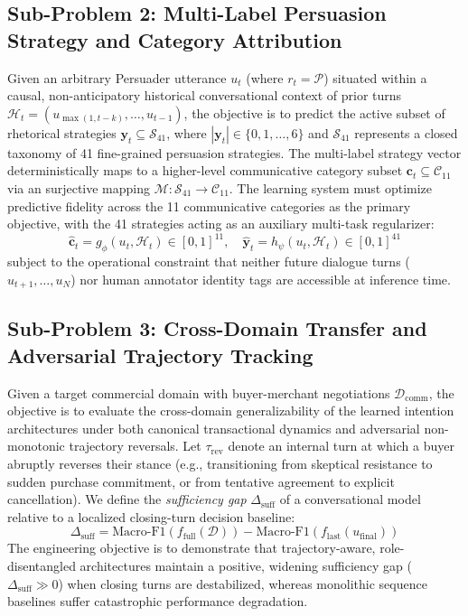 \subsection{Sub-Problem 2: Multi-Label Persuasion Strategy and Category Attribution}
Given an arbitrary Persuader utterance $u_t$ (where $r_t = \mathcal{P}$) situated within a causal, non-anticipatory historical conversational context of prior turns $\mathcal{H}_t = (u_{\max(1, t-k)}, \dots, u_{t-1})$, the objective is to predict the active subset of rhetorical strategies $\mathbf{y}_t \subseteq \mathcal{S}_{41}$, where $|\mathbf{y}_t| \in \{0, 1, \dots, 6\}$ and $\mathcal{S}_{41}$ represents a closed taxonomy of 41 fine-grained persuasion strategies. The multi-label strategy vector deterministically maps to a higher-level communicative category subset $\mathbf{c}_t \subseteq \mathcal{C}_{11}$ via an surjective mapping $\mathcal{M}: \mathcal{S}_{41} \to \mathcal{C}_{11}$. The learning system must optimize predictive fidelity across the 11 communicative categories as the primary objective, with the 41 strategies acting as an auxiliary multi-task regularizer:
\begin{equation}
  \hat{\mathbf{c}}_t = g_\phi(u_t, \mathcal{H}_t) \in [0, 1]^{11}, \quad \hat{\mathbf{y}}_t = h_\psi(u_t, \mathcal{H}_t) \in [0, 1]^{41}
\end{equation}
subject to the operational constraint that neither future dialogue turns ($u_{t+1}, \dots, u_N$) nor human annotator identity tags are accessible at inference time.

\subsection{Sub-Problem 3: Cross-Domain Transfer and Adversarial Trajectory Tracking}
Given a target commercial domain with buyer-merchant negotiations $\mathcal{D}_{\text{comm}}$, the objective is to evaluate the cross-domain generalizability of the learned intention architectures under both canonical transactional dynamics and adversarial non-monotonic trajectory reversals. Let $\tau_{\text{rev}}$ denote an internal turn at which a buyer abruptly reverses their stance (e.g., transitioning from skeptical resistance to sudden purchase commitment, or from tentative agreement to explicit cancellation). We define the \textit{sufficiency gap} $\Delta_{\text{suff}}$ of a conversational model relative to a localized closing-turn decision baseline:
\begin{equation}
  \Delta_{\text{suff}} = \text{Macro-F1}(f_{\text{full}}(\mathcal{D})) - \text{Macro-F1}(f_{\text{last}}(u_{\text{final}}))
  \label{eq:sufficiency_gap}
\end{equation}
The engineering objective is to demonstrate that trajectory-aware, role-disentangled architectures maintain a positive, widening sufficiency gap ($\Delta_{\text{suff}} \gg 0$) when closing turns are destabilized, whereas monolithic sequence baselines suffer catastrophic performance degradation.

